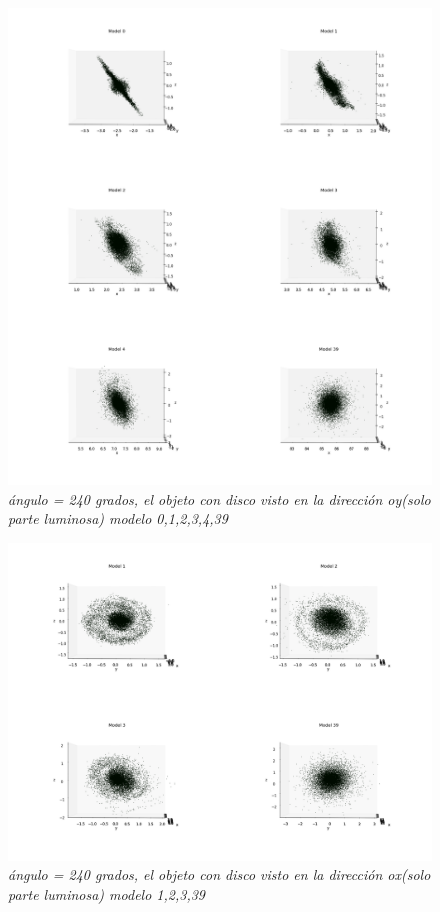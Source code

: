 \documentclass[12pt]{article} %
\renewcommand{\=}[1]{\stackrel{#1}{=}} %
\theoremstyle{definition}
\theoremstyle{remark}
\begin{document}
\begin{figure}[!ht]
 \centering
 \includegraphics[scale=0.2]{240deg-m-c2y.png}
 \caption{\emph{ ángulo = 240 grados, el objeto con disco visto en la dirección oy(solo parte luminosa) modelo 0,1,2,3,4,39 }}
\end{figure}

\begin{figure}[!ht]
 \centering
 \includegraphics[scale=0.2]{240deg-m-c2.png}
 \caption{\emph{ ángulo = 240 grados, el objeto con disco visto en la dirección ox(solo parte luminosa) modelo 1,2,3,39 }}
\end{figure}
\end{document}
